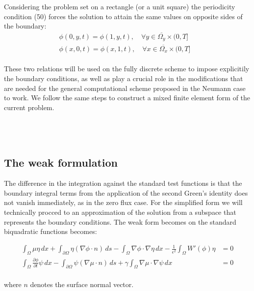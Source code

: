 \documentclass{article}
\begin{document}
Considering the problem set on a rectangle (or a unit square) the periodicity condition (50) forces the solution to attain the same values on opposite sides of the boundary:\\



\begin{align}
\phi(0,y,t) = \phi(1,y,t),\quad \forall y\in \overline{\Omega_y}\times(0,T]&\\
\phi(x,0,t) = \phi(x,1,t),\quad \forall x\in \overline{\Omega_x}\times(0,T]
\end{align}\\

These two relations will be used on the fully discrete scheme to impose explicitily the boundary conditions, as well as play a crucial role in the modifications that are needed for the general computational scheme proposed in the Neumann case to work. We follow the same steps to construct a mixed finite element form of the current problem.\\\\\\\\

\subsection{The weak formulation}

The difference in the integration against the standard test functions is that the boundary integral terms from the application of the second Green's identity does not vanish immediately, as in the zero flux case. For the simplified form we will technically procced to an approximation of the solution from a subspace that represents the boundary conditions.  The weak form becomes on the standard biquadratic functions becomes:

\begin{align}
\int_\Omega \mu\eta \, dx +\int_{\partial{\Omega}}\eta(\nabla\phi\cdot n)\,ds -\int_\Omega \nabla\phi\cdot \nabla\eta \, dx - \frac{1}{\epsilon^2}\int_\Omega  W'(\phi)\eta
&= 0\\
\int_\Omega\frac{\partial \phi}{\partial t} \psi \, dx -\int_{\partial{\Omega}}\psi(\nabla \mu\cdot n)\,ds + \gamma\int_\Omega \nabla \mu \cdot \nabla \psi \, dx &= 0
\end{align}\\
where $n$ denotes the surface normal vector.\\
\end{document}
